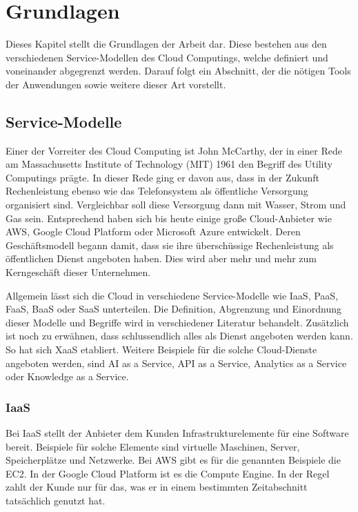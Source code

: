\chapter{Grundlagen}

Dieses Kapitel stellt die Grundlagen der Arbeit dar. Diese bestehen aus den verschiedenen Service-Modellen des Cloud Computings, welche definiert und voneinander abgegrenzt werden. Darauf folgt ein Abschnitt, der die nötigen Tools der Anwendungen sowie weitere dieser Art vorstellt.

\section{Service-Modelle}

Einer der Vorreiter des Cloud Computing ist John McCarthy, der in einer Rede am Massachusetts Institute of Technology (MIT) 1961 den Begriff des Utility Computings prägte. In dieser Rede ging er davon aus, dass in der Zukunft Rechenleistung ebenso wie das Telefonsystem als öffentliche Versorgung organisiert sind. Vergleichbar soll diese Versorgung dann mit Wasser, Strom und Gas sein. Entsprechend haben sich bis heute einige große Cloud-Anbieter wie \ac{AWS}, Google Cloud Platform oder Microsoft Azure entwickelt. Deren Geschäftsmodell begann damit, dass sie ihre überschüssige Rechenleistung als öffentlichen Dienst angeboten haben. Dies wird aber mehr und mehr zum Kerngeschäft dieser Unternehmen. \autocite{buyya2013mastering}

Allgemein lässt sich die Cloud in verschiedene Service-Modelle wie \ac{IaaS}, \ac{PaaS}, \ac{FaaS}, \ac{BaaS} oder \ac{SaaS} unterteilen. Die Definition, Abgrenzung und Einordnung dieser Modelle und Begriffe wird in verschiedener Literatur \autocite{jiang2020overview} \autocite{kumar2019serverless} \autocite{dahunsi2021commercial} behandelt. Zusätzlich ist noch zu erwähnen, dass schlussendlich alles als Dienst angeboten werden kann. So hat sich \ac{XaaS} etabliert. Weitere Beispiele für die solche Cloud-Dienste angeboten werden, sind AI as a Service, API as a Service, Analytics as a Service oder Knowledge as a Service.

\subsection{\acl{IaaS}}

Bei \acf{IaaS} stellt der Anbieter dem Kunden Infrastrukturelemente für eine Software bereit. Beispiele für solche Elemente sind virtuelle Maschinen, Server, Speicherplätze und Netzwerke. Bei \ac{AWS} gibt es für die genannten Beispiele die \ac{EC2}. In der Google Cloud Platform ist es die Compute Engine. In der Regel zahlt der Kunde nur für das, was er in einem bestimmten Zeitabschnitt tatsächlich genutzt hat.

